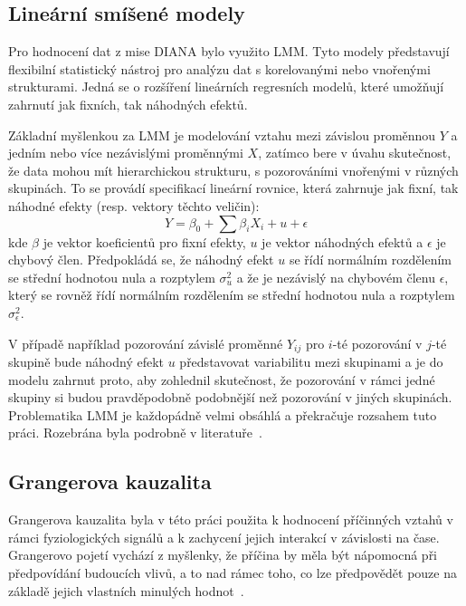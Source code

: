 \subsection{Lineární smíšené modely}
\label{subsec:lmm}
Pro hodnocení dat z mise DIANA bylo využito \gls{LMM}. Tyto modely představují
flexibilní statistický nástroj pro analýzu dat s korelovanými nebo vnořenými
strukturami. Jedná se o rozšíření lineárních regresních modelů, které umožňují
zahrnutí jak fixních, tak náhodných efektů.

Základní myšlenkou za LMM je modelování vztahu mezi závislou proměnnou $Y$ a
jedním nebo více nezávislými proměnnými $X$, zatímco bere v úvahu skutečnost, že
data mohou mít hierarchickou strukturu, s pozorováními vnořenými v různých
skupinách. To se provádí specifikací lineární rovnice, která zahrnuje jak fixní,
tak náhodné efekty (resp. vektory těchto veličin):
\begin{equation}
    Y = \beta_0 + \sum \beta_i X_i + u + \epsilon
\end{equation}
kde $\beta$ je vektor koeficientů pro fixní efekty, $u$ je vektor náhodných
efektů a $\epsilon$ je chybový člen. Předpokládá se, že náhodný efekt $u$ se
řídí normálním rozdělením se střední hodnotou nula a rozptylem $\sigma_u^2$ a že
je nezávislý na chybovém členu $\epsilon$, který se rovněž řídí normálním
rozdělením se střední hodnotou nula a rozptylem $\sigma_\epsilon^2$.

V případě například pozorování závislé proměnné $Y_{ij}$ pro $i$-té pozorování v
$j$-té skupině bude náhodný efekt $u$ představovat variabilitu mezi skupinami a
je do modelu zahrnut proto, aby zohlednil skutečnost, že pozorování v rámci
jedné skupiny si budou pravděpodobně podobnější než pozorování v jiných
skupinách. Problematika \gls{LMM} je každopádně velmi obsáhlá a překračuje
rozsahem tuto práci. Rozebrána byla podrobně v literatuře~\cite{West2022}.

\subsection{Grangerova kauzalita}
\label{subsec:granger}
Grangerova kauzalita byla v této práci použita k hodnocení příčinných vztahů v
rámci fyziologických signálů a k zachycení jejich interakcí v závislosti na
čase. Grangerovo pojetí vychází z myšlenky, že příčina by měla být nápomocná při
předpovídání budoucích vlivů, a to nad rámec toho, co lze předpovědět pouze na
základě jejich vlastních minulých hodnot~\cite{Granger1969}.

